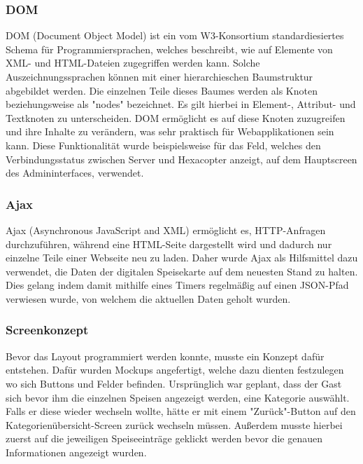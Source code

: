     \subsubsection{DOM}

{DOM\cite{dom}} (Document Object Model) ist ein vom W3-Konsortium standardiesiertes Schema für Programmiersprachen, welches beschreibt, wie auf Elemente von XML- und HTML-Dateien zugegriffen werden kann. Solche Auszeichnungssprachen können mit einer hierarchieschen Baumstruktur abgebildet werden. Die einzelnen Teile dieses Baumes werden als Knoten beziehungsweise als "nodes" bezeichnet.  Es gilt hierbei in Element-, Attribut- und Textknoten zu unterscheiden. DOM ermöglicht es auf diese Knoten zuzugreifen und ihre Inhalte zu verändern, was sehr praktisch für Webapplikationen sein kann. Diese Funktionalität wurde beispielsweise für das Feld, welches den Verbindungsstatus zwischen Server und Hexacopter anzeigt, auf dem Hauptscreen des Admininterfaces, verwendet.

    \subsubsection{Ajax}

{Ajax\cite{ajax}} (Asynchronous JavaScript and XML) ermöglicht es, HTTP-Anfragen durchzuführen, während eine HTML-Seite dargestellt wird und dadurch nur einzelne Teile einer Webseite neu zu laden. Daher wurde Ajax als Hilfsmittel dazu verwendet, die Daten der digitalen Speisekarte auf dem neuesten Stand zu halten. Dies gelang indem damit mithilfe eines Timers regelmäßig auf einen JSON-Pfad verwiesen wurde, von welchem die aktuellen Daten geholt wurden.

    \subsubsection{Screenkonzept}
Bevor das Layout programmiert werden konnte, musste ein Konzept dafür entstehen. Dafür wurden Mockups angefertigt, welche dazu dienten festzulegen wo sich Buttons und Felder befinden.
Ursprünglich war geplant, dass der Gast sich bevor ihm die einzelnen Speisen angezeigt werden, eine Kategorie auswählt. Falls er diese wieder wechseln wollte, hätte er mit einem "Zurück"-Button auf den Kategorienübersicht-Screen zurück wechseln müssen. Außerdem musste hierbei zuerst auf die jeweiligen Speiseeinträge geklickt werden bevor die genauen Informationen angezeigt wurden.
\\
\pagebreak


